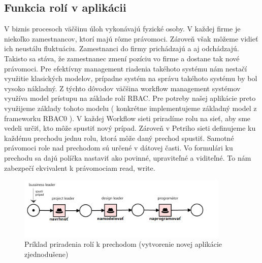 

\subsection{Funkcia rolí v aplikácii}
V biznis procesoch väčšinu úloh vykonávajú fyzické osoby. V každej firme je niekoľko zamestnancov, ktorí majú rôzne právomoci. Zároveň však môžeme vidieť ich neustálu fluktuáciu. Zamestnanci do firmy prichádzajú a aj odchádzajú. Takisto sa stáva, že zamestnanec zmení pozíciu vo firme a dostane tak nové právomoci. Pre efektívny management riadenia takéhoto systému nám nestačí využitie klasických modelov, prípadne systém na správu takéhoto systému by bol vysoko nákladný. Z týchto dôvodov väčšina workflow management systémov využíva model  prístupu na základe rolí RBAC. Pre potreby našej aplikácie preto využijeme základy tohoto modelu ( konkrétne implementujeme základný model z frameworku RBAC0 \cite{sandhu96}). V každej Workflow sieti priradíme rolu na sieť, aby sme vedeli určiť, kto môže spustiť nový prípad. Zároveň v Petriho sieti definujeme ku každému prechodu jednu rolu, ktorá môže daný prechod spustiť. Samotné právomoci role nad prechodom sú určené v dátovej časti. Vo formulári ku prechodu sa dajú políčka nastaviť ako povinné, upraviteľné a viditeľné. To nám zabezpečí ekvivalent k právomociam read, write. 

\begin{figure}[h]
	\centerline{\includegraphics[width=0.9\textwidth]{images/vyvoj_role}}
	\caption[Príklad priradenia rolí k prechodom]{Príklad priradenia rolí k prechodom (vytvorenie novej aplikácie zjednodušene)}
	\label{obr:role_na prechody}
\end{figure}




